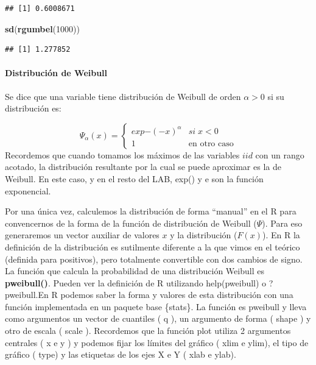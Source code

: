 \documentclass[
  12pt]{article}
\newenvironment{Shaded}{\begin{snugshade}}{\end{snugshade}}
\newcommand{\DecValTok}[1]{\textcolor[rgb]{0.00,0.00,0.81}{#1}}
\newcommand{\FunctionTok}[1]{\textcolor[rgb]{0.13,0.29,0.53}{\textbf{#1}}}
\newcommand{\NormalTok}[1]{#1}
\begin{document}
\begin{verbatim}
## [1] 0.6008671
\end{verbatim}

\begin{Shaded}
\begin{Highlighting}[]
\FunctionTok{sd}\NormalTok{(}\FunctionTok{rgumbel}\NormalTok{(}\DecValTok{1000}\NormalTok{))}
\end{Highlighting}
\end{Shaded}

\begin{verbatim}
## [1] 1.277852
\end{verbatim}

\hypertarget{distribuciuxf3n-de-weibull}{%
\paragraph{Distribución de Weibull}\label{distribuciuxf3n-de-weibull}}

Se dice que una variable tiene distribución de Weibull de orden
\(\alpha>0\) si su distribución es:

\[\Psi_{\alpha}(x)=\begin{cases}
exp{-(-x)^{\alpha}} & si\;x<0\\
1 & \text{en otro caso}
\end{cases}\] Recordemos que cuando tomamos los máximos de las variables
\(iid\) con un rango acotado, la distribución resultante por la cual se
puede aproximar es la de Weibull. En este caso, y en el resto del LAB,
exp() y e son la función exponencial.

Por una única vez, calculemos la distribución de forma ``manual'' en el
R para convencernos de la forma de la función de distribución de Weibull
(\(\Psi\)). Para eso generaremos un vector auxiliar de valores \(x\) y
la distribución (\(F(x)\)). En R la definición de la distribución es
sutilmente diferente a la que vimos en el teórico (definida para
positivos), pero totalmente convertible con dos cambios de signo. La
función que calcula la probabilidad de una distribución Weibull es
\textbf{pweibull()}. Pueden ver la definición de R utilizando
help(pweibull) o ?pweibull.En R podemos saber la forma y valores de esta
distribución con una función implementada en un paquete base \{stats\}.
La función es pweibull y lleva como argumentos un vector de cuantiles (
q ), un argumento de forma ( shape ) y otro de escala ( scale ).
Recordemos que la función plot utiliza 2 argumentos centrales ( x e y )
y podemos fijar los límites del gráfico ( xlim e ylim), el tipo de
gráfico ( type) y las etiquetas de los ejes X e Y ( xlab e ylab).
\end{document}
